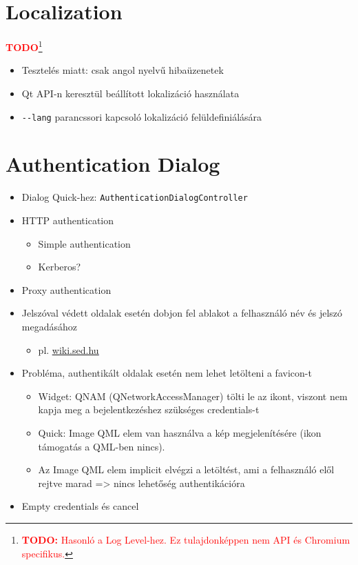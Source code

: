 \documentclass[12pt]{report}
\let\origurl\url
\renewcommand{\url}[1]{%
    \textcolor{blue}{\underline{\origurl{#1}}}
}
\newcommand{\todo}[1]{%
    \textcolor{red}{\textbf{TODO}}\footnote{\textcolor{red}{\textbf{TODO:} #1}}
}
\begin{document}
\section{Localization}
\todo{Hasonló a Log Level-hez. Ez tulajdonképpen nem API és Chromium specifikus.}
\begin{itemize}
    \item Tesztelés miatt: csak angol nyelvű hibaüzenetek
    \item Qt API-n keresztül beállított lokalizáció használata
    \item \texttt{-{}-lang} parancssori kapcsoló lokalizáció felüldefiniálására
\end{itemize}
\pagebreak

\section{Authentication Dialog}
\begin{itemize}
    \item Dialog Quick-hez: \texttt{AuthenticationDialogController}
    \item HTTP authentication
        \begin{itemize}
            \item Simple authentication
            \item Kerberos?
        \end{itemize}
    \item Proxy authentication
    \item Jelszóval védett oldalak esetén dobjon fel ablakot a felhasználó név és jelszó
        megadásához
        \begin{itemize}
            \item pl. \url{wiki.sed.hu}
        \end{itemize}
    \item Probléma, authentikált oldalak esetén nem lehet letölteni a favicon-t
        \begin{itemize}
            \item Widget: QNAM (QNetworkAccessManager) tölti le az ikont, viszont nem kapja
                meg a bejelentkezéshez szükséges credentials-t
            \item Quick: Image QML elem van használva a kép megjelenítésére (ikon támogatás a
                QML-ben nincs).
            \item Az Image QML elem implicit elvégzi a letöltést, ami a felhasználó elől
                rejtve marad => nincs lehetőség authentikációra
        \end{itemize}
    \item Empty credentials és cancel
\end{itemize}
\pagebreak
\end{document}
